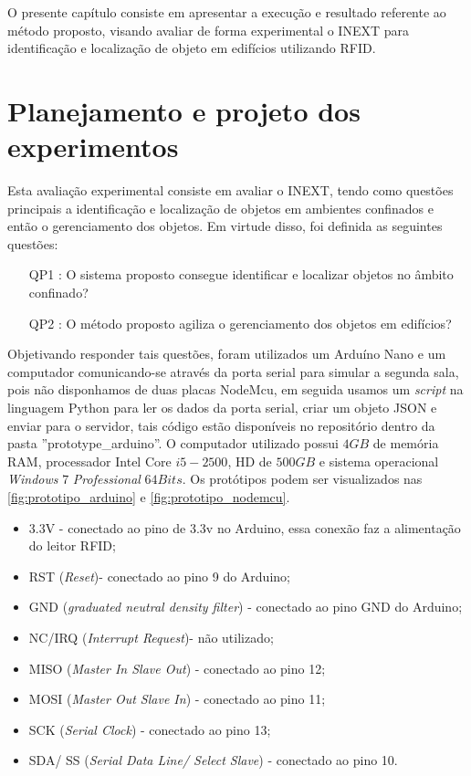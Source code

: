 \label{chapter:resultados}
O presente capítulo consiste em apresentar a execução e resultado referente ao método proposto, visando avaliar de forma experimental o INEXT para identificação e localização de objeto em edifícios utilizando RFID.

\section{Planejamento e projeto dos experimentos}
Esta avaliação experimental consiste em avaliar o INEXT, tendo como questões principais a identificação e localização de objetos em ambientes confinados e então o gerenciamento dos objetos. Em virtude disso, foi definida as seguintes questões:
\begin{itemize}
    \item[QP1]: O sistema proposto consegue identificar e localizar objetos no âmbito confinado?
    \item[QP2]: O método proposto agiliza o gerenciamento dos objetos em edifícios?
    
\end{itemize}{}
\par 
Objetivando responder tais questões, foram utilizados um Arduíno Nano e um computador comunicando-se através da porta serial para simular a segunda sala, pois não disponhamos de duas placas NodeMcu, em seguida usamos um \textit{script} na linguagem Python para ler os dados da porta serial, criar um objeto JSON e enviar para o servidor, tais código estão disponíveis no repositório dentro da pasta ''prototype\_arduino''. O computador utilizado possui $4GB$ de memória RAM, processador Intel Core $i5-2500$, HD de $500GB$ e sistema operacional \textit{Windows} $7$ \textit{Professional} $64Bits$.  Os protótipos podem ser visualizados nas \autoref{fig:prototipo_arduino} e \autoref{fig:prototipo_nodemcu}. 

\begin{itemize}
    \item 3.3V - conectado ao pino de 3.3v no Arduino, essa conexão faz a alimentação do leitor RFID;
    \item RST (\textit{Reset})- conectado ao pino 9 do Arduino;
    \item GND (\textit{graduated neutral density filter}) - conectado ao pino GND do Arduino;
    \item NC/IRQ (\textit{Interrupt Request})- não utilizado;
    \item MISO (\textit{Master In Slave Out}) - conectado ao pino 12;
    \item MOSI  (\textit{Master Out Slave In}) - conectado ao pino 11;
    \item SCK  (\textit{Serial Clock}) - conectado ao pino 13;
    \item SDA/ SS (\textit{Serial Data Line/ Select Slave}) - conectado ao pino 10.
\end{itemize}    

